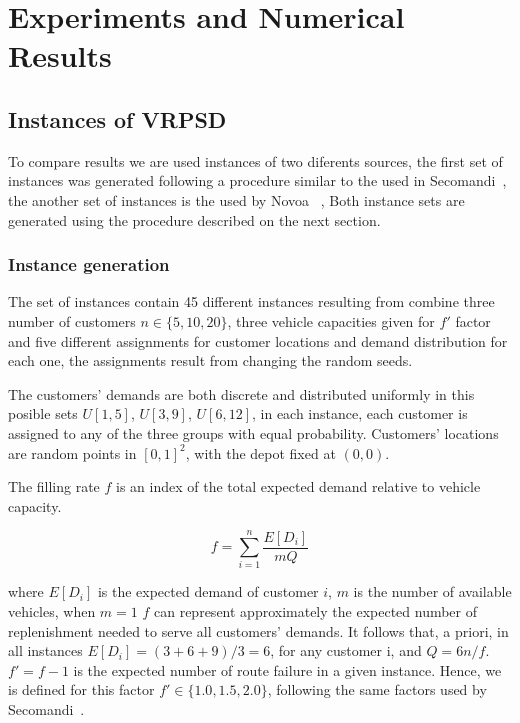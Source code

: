 \chapter{Experiments and Numerical Results}
\label{chap:results}

\section{Instances of VRPSD}

To compare results we are used instances of two diferents sources, the first set of instances was generated following a procedure similar to the used in Secomandi~\cite{secomandi_comparing_2000}, the another set of instances is the used by Novoa ~\cite{novoa_approximate_2009}, Both instance sets are generated using the procedure described on the next section.

\subsection{Instance generation}

The set of instances contain 45 different instances resulting from combine three number of customers $n \in \{5,10,20\}$, three vehicle capacities given for $f'$ factor and five different assignments for customer locations and demand distribution for each one, the assignments result from changing the random seeds.

The customers' demands are both discrete and distributed uniformly in this posible sets $U[1,5]$, $U[3,9]$, $U[6,12]$, in each instance, each customer is assigned to any of the three groups with equal probability. Customers' locations are random points in $[0, 1]^2$, with the depot fixed at $(0,0)$.%


The filling rate $f$ is an index of the total expected demand relative to vehicle capacity.

\begin{equation}\label{eq:4filling-rate}
f=\sum_{i=1}^n\frac{E[D_i]}{mQ}
\end{equation}

where $E[D_i]$ is the expected demand of customer $i$, $m$ is the number of available vehicles, when $m = 1$ $f$ can represent approximately the expected number of replenishment needed to serve all customers' demands. It follows that, a priori, in all instances $E[D_i]=(3+6+9)/3=6$, for any customer i, and $Q=6n/f$. $f'=f-1$ is the expected number of route failure in a given instance. Hence, we is defined for this factor $f' \in \{1.0, 1.5, 2.0\}$, following the same factors used by Secomandi~\cite{secomandi_comparing_2000}.

